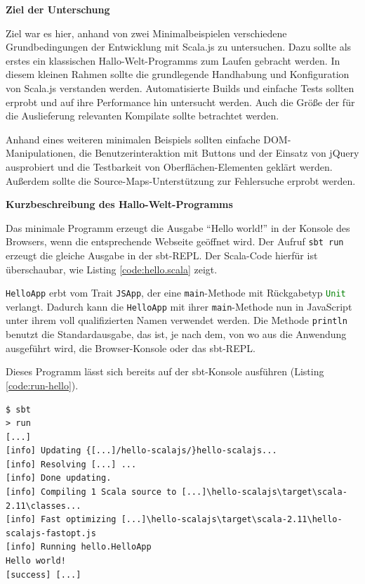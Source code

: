 \documentclass[a4paper, 12pt, hidelinks, listof=totoc, listoftables=totoc, bibliography=totoc]{scrreprt}
\newcommand{\code}[1]{\lstinline[language=Scala, style=inline]|#1|}
\newcommand{\scala}[1]{\lstinline[language=Scala, style=inline]|#1|}
\newcommand{\MyMiniSec}[1]{\rmfamily\fontsize{12}{15}\selectfont
	\vspace{7pt}\textbf{#1} %
}
\begin{document}
\MyMiniSec{Ziel der Unterschung}

Ziel war es hier, anhand von zwei Minimalbeispielen verschiedene Grundbedingungen der Entwicklung mit Scala.js zu untersuchen. Dazu sollte als erstes ein klassischen Hallo-Welt-Programms zum Laufen gebracht werden. In diesem kleinen Rahmen sollte die grundlegende Handhabung und Konfiguration von Scala.js verstanden werden. Automatisierte Builds und einfache Tests sollten erprobt und auf ihre Performance hin untersucht werden. Auch die Größe der für die Auslieferung relevanten Kompilate sollte betrachtet werden.

Anhand eines weiteren minimalen Beispiels sollten einfache \ac{DOM}-Manipulationen, die Benutzerinteraktion mit Buttons und der Einsatz von jQuery ausprobiert und die Testbarkeit von Oberflächen-Elementen geklärt werden. Außerdem sollte die Source-Maps-Unterstützung zur Fehlersuche erprobt werden.


\MyMiniSec{Kurzbeschreibung des Hallo-Welt-Programms}

Das minimale Programm erzeugt die Ausgabe "`Hello world!"' in der Konsole des Browsers, wenn die entsprechende Webseite geöffnet wird. Der Aufruf \code{sbt run} erzeugt die gleiche Ausgabe in der sbt-\ac{REPL}. Der Scala-Code hierfür ist überschaubar, wie Listing \ref{code:hello.scala} zeigt.



\scala{HelloApp} erbt vom Trait \scala{JSApp}, der eine \scala{main}-Methode mit Rückgabetyp \scala{Unit} verlangt. Dadurch kann die \scala{HelloApp} mit ihrer \scala{main}-Methode nun in JavaScript unter ihrem voll qualifizierten Namen verwendet werden. Die Methode \scala{println} benutzt die Standardausgabe, das ist, je nach dem, von wo aus die Anwendung ausgeführt wird, die Browser-Konsole oder das sbt-\ac{REPL}.

Dieses Programm lässt sich bereits auf der sbt-Konsole ausführen (Listing \ref{code:run-hello}).

\begin{lstlisting}[caption={Lauf des Hallo-Welt-Programms in der sbt-REPL.}, label={code:run-hello}]
$ sbt
> run
[...]
[info] Updating {[...]/hello-scalajs/}hello-scalajs...
[info] Resolving [...] ...
[info] Done updating.
[info] Compiling 1 Scala source to [...]\hello-scalajs\target\scala-2.11\classes...
[info] Fast optimizing [...]\hello-scalajs\target\scala-2.11\hello-scalajs-fastopt.js
[info] Running hello.HelloApp
Hello world!
[success] [...]
\end{lstlisting}
\end{document}
